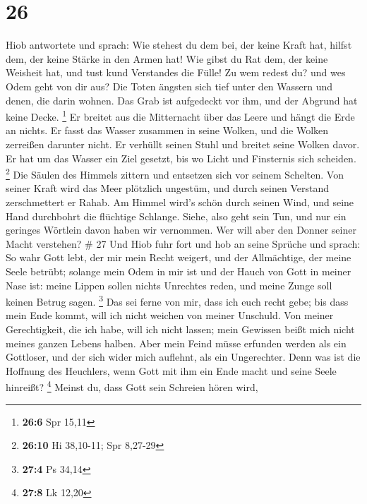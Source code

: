 \hypertarget{section-6}{%
\section{26}\label{section-6}}

 Hiob antwortete und sprach:  Wie stehest du
dem bei, der keine Kraft hat, hilfst dem, der keine Stärke in den Armen
hat!  Wie gibst du Rat dem, der keine Weisheit hat, und
tust kund Verstandes die Fülle!  Zu wem redest du? und wes
Odem geht von dir aus?  Die Toten ängsten sich tief unter
den Wassern und denen, die darin wohnen.  Das Grab ist
aufgedeckt vor ihm, und der Abgrund hat keine Decke. \footnote{\textbf{26:6}
  Spr 15,11}  Er breitet aus die Mitternacht über das
Leere und hängt die Erde an nichts.  Er fasst das Wasser
zusammen in seine Wolken, und die Wolken zerreißen darunter nicht.
 Er verhüllt seinen Stuhl und breitet seine Wolken davor.
 Er hat um das Wasser ein Ziel gesetzt, bis wo Licht und
Finsternis sich scheiden. \footnote{\textbf{26:10} Hi 38,10-11; Spr
  8,27-29}  Die Säulen des Himmels zittern und entsetzen
sich vor seinem Schelten.  Von seiner Kraft wird das Meer
plötzlich ungestüm, und durch seinen Verstand zerschmettert er Rahab.
 Am Himmel wird's schön durch seinen Wind, und seine Hand
durchbohrt die flüchtige Schlange.  Siehe, also geht sein
Tun, und nur ein geringes Wörtlein davon haben wir vernommen. Wer will
aber den Donner seiner Macht verstehen? \# 27  Und Hiob
fuhr fort und hob an seine Sprüche und sprach:  So wahr
Gott lebt, der mir mein Recht weigert, und der Allmächtige, der meine
Seele betrübt;  solange mein Odem in mir ist und der Hauch
von Gott in meiner Nase ist:  meine Lippen sollen nichts
Unrechtes reden, und meine Zunge soll keinen Betrug sagen. \footnote{\textbf{27:4}
  Ps 34,14}  Das sei ferne von mir, dass ich euch recht
gebe; bis dass mein Ende kommt, will ich nicht weichen von meiner
Unschuld.  Von meiner Gerechtigkeit, die ich habe, will
ich nicht lassen; mein Gewissen beißt mich nicht meines ganzen Lebens
halben.  Aber mein Feind müsse erfunden werden als ein
Gottloser, und der sich wider mich auflehnt, als ein Ungerechter.
 Denn was ist die Hoffnung des Heuchlers, wenn Gott mit
ihm ein Ende macht und seine Seele hinreißt? \footnote{\textbf{27:8} Lk
  12,20}  Meinst du, dass Gott sein Schreien hören wird,
